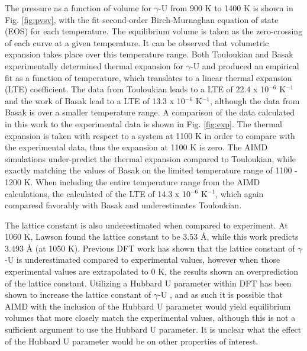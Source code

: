 \documentclass[review]{elsarticle}
\begin{document}
The pressure as a function of volume for $\gamma$-U from 900 K to 1400 K is shown in Fig. \ref{fig:pvsv}, with the fit second-order Birch-Murnaghan equation of state (EOS) for each temperature. The equilibrium volume is taken as the zero-crossing of each curve at a given temperature. It can be observed that volumetric expansion takes place over this temperature range. Both Touloukian \cite{touloukian} and Basak \cite{basak} experimentally determined thermal expansion for $\gamma$-U and produced an empirical fit as a function of temperature, which translates to a linear thermal expansion (LTE) coefficient. The data from Touloukian leads to a LTE of 22.4 x 10$^{-6}$ K$^{-1}$ and the work of Basak lead to a LTE of 13.3 x 10$^{-6}$ K$^{-1}$, although the data from Basak is over a smaller temperature range. A comparison of the data calculated in this work to the experimental data is shown in Fig. \ref{fig:exp}. The thermal expansion is taken with respect to a system at 1100 K in order to compare with the experimental data, thus the expansion at 1100 K is zero. The AIMD simulations under-predict the thermal expansion compared to Touloukian, while exactly matching the values of Basak on the limited temperature range of 1100 - 1200 K. When including the entire temperature range from the AIMD calculations, the calculated of the LTE of 14.3 x 10$^{-6}$ K$^{-1}$, which again comparesd favorably with Basak and underestimates Touloukian.

The lattice constant is also underestimated when compared to experiment. At 1060 K, Lawson \cite{lawson1988} found the lattice constant to be 3.53 {\AA}, while this work predicts 3.493 {\AA} (at 1050 K). Previous DFT work has shown that the lattice constant of $\gamma$-U is underestimated compared to experimental values, however when those experimental values are extrapolated to 0 K, the results shown an overprediction of the lattice constant\cite{beeler2010, xie2013}. Utilizing a Hubbard U parameter within DFT has been shown to increase the lattice constant of $\gamma$-U \cite{xie2013}, and as such it is possible that AIMD with the inclusion of the Hubbard U parameter would yield equilibrium volumes that more closely match the experimental values, although this is not a sufficient argument to use the Hubbard U parameter. It is unclear what the effect of the Hubbard U parameter would be on other properties of interest. 
\end{document}
